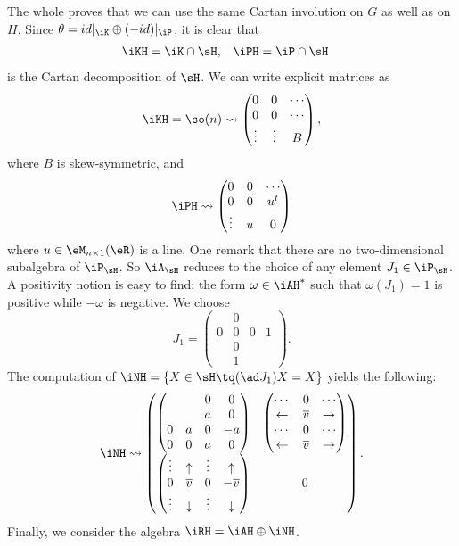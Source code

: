 The whole proves that we can use the same Cartan involution on $G$ as well as on $H$. Since $\theta=id|_{\iK}\oplus(-id)|_{\iP}$, it is clear that
\begin{align}
	\iKH & =\iK\cap\sH,
	     & \iPH         & =\iP\cap\sH
\end{align}
is the Cartan decomposition of $\sH$. We can write explicit matrices as
\begin{equation}
	\iKH=\so(n)\leadsto
	\begin{pmatrix}
		0      & 0      & \cdots \\
		0      & 0      & \cdots \\
		\vdots & \vdots & B
	\end{pmatrix},
\end{equation}
where $B$ is skew-symmetric, and
\begin{equation}
	\iPH\leadsto
	\begin{pmatrix}
		0      & 0 & \cdots \\
		0      & 0 & u^t    \\
		\vdots & u & 0
	\end{pmatrix}
\end{equation}
where $u\in\eM_{n\times 1}(\eR)$ is a line. One remark that there are no two-dimensional subalgebra of $\iP_{\sH}$. So $\iA_{\sH}$ reduces to the choice of any element $J_1\in\iP_{\sH}$.  A positivity notion is easy to find: the form $\omega\in\iAH^*$ such that $\omega(J_1)=1$ is positive while $-\omega$ is negative. We choose
\[
	J_1=\begin{pmatrix}&0\\0&0&0&1\\&0\\&1\end{pmatrix}.
\]
The computation of $\iNH=\{X\in\sH\tq (\ad J_1)X=X\}$ yields the following:
\begin{equation}\label{eq:re_N_H}
	\iNH\leadsto
	\begin{pmatrix}
		\begin{pmatrix} &&0&0\\&&a&0\\0&a&0&-a\\0&0&a&0\end{pmatrix}
		 & \begin{pmatrix}\cdots & 0 & \cdots \\\leftarrow&\overline{v}&\rightarrow\\
               \cdots & 0 & \cdots \\\leftarrow&\overline{v}&\rightarrow\end{pmatrix} \\
		\begin{pmatrix}\vdots & \uparrow     & \vdots & \uparrow      \\
               0      & \overline{v} & 0      & -\overline{v} \\
               \vdots & \downarrow   & \vdots & \downarrow\end{pmatrix}
		 & 0
	\end{pmatrix}.
\end{equation}
Finally, we consider the algebra $\iRH=\iAH\oplus\iNH$.

